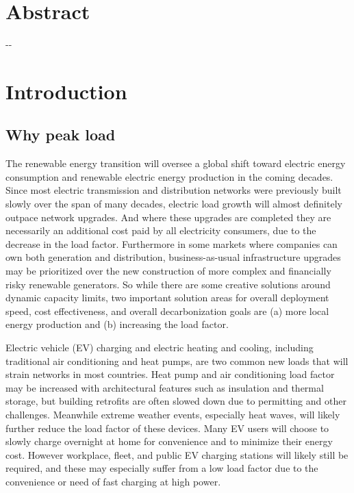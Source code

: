 \documentclass[
]{article}
\author{}
\date{}
\begin{document}
\hypertarget{abstract}{%
\section{Abstract}\label{abstract}}

-\/-

\hypertarget{introduction}{%
\section{Introduction}\label{introduction}}

\hypertarget{why-peak-load}{%
\subsection{Why peak load}\label{why-peak-load}}

The renewable energy transition will oversee a global shift toward
electric energy consumption and renewable electric energy production in
the coming decades. Since most electric transmission and distribution
networks were previously built slowly over the span of many decades,
electric load growth will almost definitely outpace network upgrades.
And where these upgrades are completed they are necessarily an
additional cost paid by all electricity consumers, due to the decrease
in the load factor. Furthermore in some markets where companies can own
both generation and distribution, business-as-usual infrastructure
upgrades may be prioritized over the new construction of more complex
and financially risky renewable generators. So while there are some
creative solutions around dynamic capacity limits, two important
solution areas for overall deployment speed, cost effectiveness, and
overall decarbonization goals are (a) more local energy production and
(b) increasing the load factor.

Electric vehicle (EV) charging and electric heating and cooling,
including traditional air conditioning and heat pumps, are two common
new loads that will strain networks in most countries. Heat pump and air
conditioning load factor may be increased with architectural features
such as insulation and thermal storage, but building retrofits are often
slowed down due to permitting and other challenges. Meanwhile extreme
weather events, especially heat waves, will likely further reduce the
load factor of these devices. Many EV users will choose to slowly charge
overnight at home for convenience and to minimize their energy cost.
However workplace, fleet, and public EV charging stations will likely
still be required, and these may especially suffer from a low load
factor due to the convenience or need of fast charging at high power.
\end{document}
